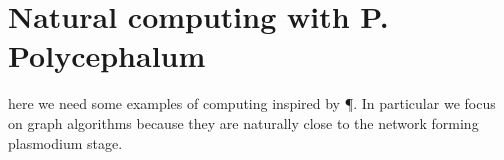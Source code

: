 \section{Natural computing with P. Polycephalum}

here we need some examples of computing inspired by \P.
In particular we focus on graph algorithms because they are naturally close to the network forming plasmodium stage.
